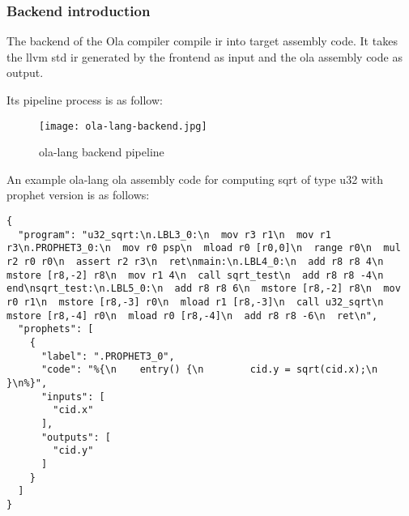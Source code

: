 \subsubsection{Backend introduction}

The backend of the Ola compiler compile ir into target assembly code. It takes the llvm std ir generated by the frontend as input and the  ola assembly code as output.

Its pipeline process is as follow:
\begin{figure}[!htbp]
    \centering
    \texttt{[image: ola-lang-backend.jpg]}
    \caption{ola-lang backend pipeline}
    \label{fig:ola-lang-backend}
\end{figure}

An example ola-lang ola assembly code for computing sqrt of type u32 with prophet version is as follows:
\begin{lstlisting}[language={}]
{
  "program": "u32_sqrt:\n.LBL3_0:\n  mov r3 r1\n  mov r1 r3\n.PROPHET3_0:\n  mov r0 psp\n  mload r0 [r0,0]\n  range r0\n  mul r2 r0 r0\n  assert r2 r3\n  ret\nmain:\n.LBL4_0:\n  add r8 r8 4\n  mstore [r8,-2] r8\n  mov r1 4\n  call sqrt_test\n  add r8 r8 -4\n  end\nsqrt_test:\n.LBL5_0:\n  add r8 r8 6\n  mstore [r8,-2] r8\n  mov r0 r1\n  mstore [r8,-3] r0\n  mload r1 [r8,-3]\n  call u32_sqrt\n  mstore [r8,-4] r0\n  mload r0 [r8,-4]\n  add r8 r8 -6\n  ret\n",
  "prophets": [
    {
      "label": ".PROPHET3_0",
      "code": "%{\n    entry() {\n        cid.y = sqrt(cid.x);\n    }\n%}",
      "inputs": [
        "cid.x"
      ],
      "outputs": [
        "cid.y"
      ]
    }
  ]
}
\end{lstlisting}

